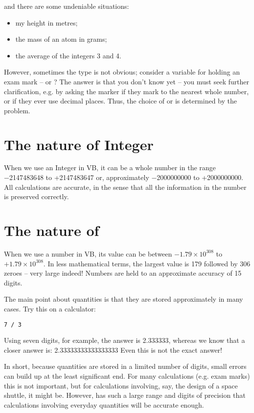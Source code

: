 		and there are some undeniable  situations:
		\begin{itemize}
			\item my height in metres;
			\item the mass of an atom in grams;
			\item the average of the integers 3 and 4.
		\end{itemize}
		
		However, sometimes the type is not obvious; consider a variable for holding an exam mark –  or ? The answer is that you don't know yet – you must seek further clarification, e.g. by asking the marker if they mark to the nearest whole number, or if they ever use decimal places. Thus, the choice of  or  is determined by the problem.

	\section{The nature of Integer}
		When we use an Integer in VB, it can be a whole number in the range −2147483648 to +2147483647 or, approximately −2000000000 to +2000000000.
		All  calculations are accurate, in the sense that all the information in the number is preserved correctly.

	\section{The nature of }
		When we use a  number in VB, its value can be between $−1.79 × 10^{308}$ to $+1.79 × 10^{308}$. In less mathematical terms, the largest value is 179 followed by 306 zeroes – very large indeed! Numbers are held to an approximate accuracy of 15 digits.
		
		The main point about  quantities is that they are stored approximately in many cases. Try this on a calculator:
		\begin{lstlisting}
7 / 3
		\end{lstlisting}
		Using seven digits, for example, the answer is 2.333333, whereas we know that a closer answer is:
2.33333333333333333
		Even this is not the exact answer!
		
		In short, because  quantities are stored in a limited number of digits, small errors can build up at the least significant end. For many calculations (e.g. exam marks) this is not important, but for calculations involving, say, the design of a space shuttle, it might be. However,  has such a large range and digits of precision that calculations involving everyday quantities will be accurate enough.

